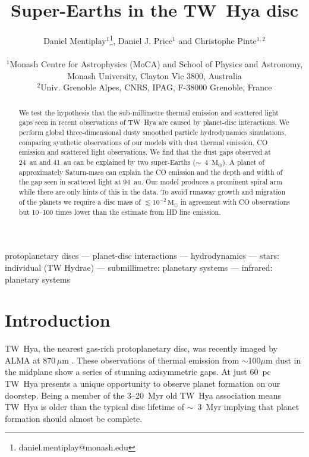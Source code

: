 \documentclass[usenatbib,a4paper,times]{mnras}
\title[Super-Earths in the TW~Hya disc]{Super-Earths in the TW~Hya disc}
\author[Mentiplay, Price \& Pinte]{\parbox{\textwidth}{Daniel
   Mentiplay$^{1}$\thanks{daniel.mentiplay@monash.edu}, Daniel J. Price$^{1}$
   and Christophe Pinte$^{1,2}$}\\
   $^{1}$Monash Centre for Astrophysics (MoCA) and School of Physics and
   Astronomy, Monash University, Clayton Vic 3800, Australia \\
   $^{2}$Univ. Grenoble Alpes, CNRS, IPAG, F-38000 Grenoble, France}
\date{}
\renewcommand{\sun}{\mathrm{M}_{\odot}}
\renewcommand{\earth}{\mathrm{M}_{\oplus}}
\begin{document}
\label{firstpage}

\maketitle


\begin{abstract}

We test the hypothesis that the sub-millimetre thermal emission and scattered
light gaps seen in recent observations of TW~Hya are caused by planet-disc
interactions. We perform global three-dimensional dusty smoothed particle
hydrodynamics simulations, comparing synthetic observations of our models with
dust thermal emission, CO emission and scattered light observations.  We find
that the dust gaps observed at 24~au and 41~au can be explained by two
super-Earths ($\sim$~4~$\earth{}$). A planet of approximately Saturn-mass can
explain the CO emission and the depth and width of the gap seen in scattered
light at 94~au. Our model produces a prominent spiral arm while there are only
hints of this in the data. To avoid runaway growth and migration of the planets
we require a disc mass of $\lesssim 10^{-2}\,\sun{}$ in agreement with CO
observations but 10--100 times lower than the estimate from HD line emission.

\end{abstract}



\begin{keywords}
protoplanetary discs --- planet-disc interactions --- hydrodynamics ---  stars:
individual (TW Hydrae) --- submillimetre: planetary systems --- infrared:
planetary systems %
\end{keywords}










\section{Introduction}

TW~Hya, the nearest gas-rich protoplanetary disc, was recently imaged by ALMA at
$870\,\mu$m \citep{andrews:2016}. These observations of thermal emission from
$\sim$100$\mu$m dust in the midplane show a series of stunning axisymmetric
gaps. At just $60$~pc \citep{gaia-collaboration:2018} TW~Hya presents a unique
opportunity to observe planet formation on our doorstep. Being a member of the
3--20~Myr old \citep{barrado-y-navascues:2006} TW~Hya association means TW~Hya
is older than the typical disc lifetime of $\sim$~3~Myr \citep{haisch:2001}
implying that planet formation should almost be complete.
\end{document}
